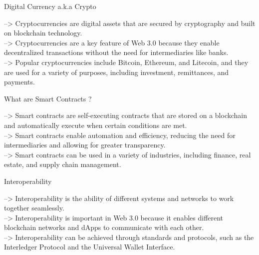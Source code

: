 \documentclass{beamer}
\begin{document}
\begin{frame}{Digital Currency a.k.a Crypto}
\begin{block}{}
--> \hspace{3mm}Cryptocurrencies are digital assets that are secured by cryptography and built on blockchain technology.\break\\
--> \hspace{3mm}Cryptocurrencies are a key feature of Web 3.0 because they enable decentralized transactions without the need for intermediaries like banks.\break\\
--> \hspace{3mm}Popular cryptocurrencies include Bitcoin, Ethereum, and Litecoin, and they are used for a variety of purposes, including investment, remittances, and payments.
\end{block}
\end{frame}

\begin{frame}{What are Smart Contracts ?}
\begin{block}{}
--> \hspace{3mm}Smart contracts are self-executing contracts that are stored on a blockchain and automatically execute when certain conditions are met.\break\\
--> \hspace{3mm}Smart contracts enable automation and efficiency, reducing the need for intermediaries and allowing for greater transparency.\break\\
--> \hspace{3mm}Smart contracts can be used in a variety of industries, including finance, real estate, and supply chain management.
\end{block}
\end{frame}

\begin{frame}{Interoperability}
\begin{block}{}
--> \hspace{3mm}Interoperability is the ability of different systems and networks to work together seamlessly.\break\\
--> \hspace{3mm}Interoperability is important in Web 3.0 because it enables different blockchain networks and dApps to communicate with each other.\break\\
--> \hspace{3mm}Interoperability can be achieved through standards and protocols, such as the Interledger Protocol and the Universal Wallet Interface.
\end{block}
\end{frame}
\end{document}
